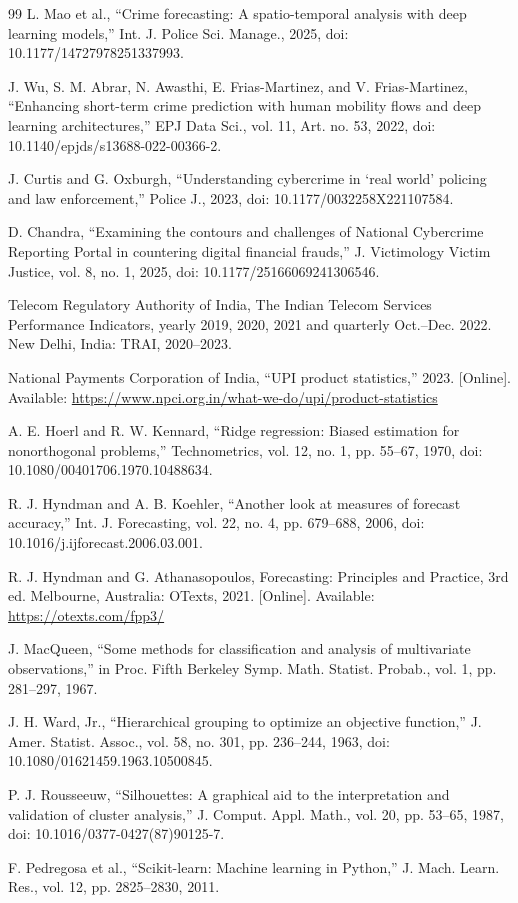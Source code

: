 \begin{thebibliography}{99}
 L. Mao et al., ``Crime forecasting: A spatio-temporal analysis with deep learning models,'' Int. J. Police Sci. Manage., 2025, doi: 10.1177/14727978251337993.

 J. Wu, S. M. Abrar, N. Awasthi, E. Frias-Martinez, and V. Frias-Martinez, ``Enhancing short-term crime prediction with human mobility flows and deep learning architectures,'' EPJ Data Sci., vol. 11, Art. no. 53, 2022, doi: 10.1140/epjds/s13688-022-00366-2.

 J. Curtis and G. Oxburgh, ``Understanding cybercrime in `real world' policing and law enforcement,'' Police J., 2023, doi: 10.1177/0032258X221107584.

 D. Chandra, ``Examining the contours and challenges of National Cybercrime Reporting Portal in countering digital financial frauds,'' J. Victimology Victim Justice, vol. 8, no. 1, 2025, doi: 10.1177/25166069241306546.

 Telecom Regulatory Authority of India, The Indian Telecom Services Performance Indicators, yearly 2019, 2020, 2021 and quarterly Oct.--Dec. 2022. New Delhi, India: TRAI, 2020--2023.

 National Payments Corporation of India, ``UPI product statistics,'' 2023. [Online]. Available: \url{https://www.npci.org.in/what-we-do/upi/product-statistics}

 A. E. Hoerl and R. W. Kennard, ``Ridge regression: Biased estimation for nonorthogonal problems,'' Technometrics, vol. 12, no. 1, pp. 55--67, 1970, doi: 10.1080/00401706.1970.10488634.

 R. J. Hyndman and A. B. Koehler, ``Another look at measures of forecast accuracy,'' Int. J. Forecasting, vol. 22, no. 4, pp. 679--688, 2006, doi: 10.1016/j.ijforecast.2006.03.001.

 R. J. Hyndman and G. Athanasopoulos, Forecasting: Principles and Practice, 3rd ed. Melbourne, Australia: OTexts, 2021. [Online]. Available: \url{https://otexts.com/fpp3/}

 J. MacQueen, ``Some methods for classification and analysis of multivariate observations,'' in Proc. Fifth Berkeley Symp. Math. Statist. Probab., vol. 1, pp. 281--297, 1967.

 J. H. Ward, Jr., ``Hierarchical grouping to optimize an objective function,'' J. Amer. Statist. Assoc., vol. 58, no. 301, pp. 236--244, 1963, doi: 10.1080/01621459.1963.10500845.

 P. J. Rousseeuw, ``Silhouettes: A graphical aid to the interpretation and validation of cluster analysis,'' J. Comput. Appl. Math., vol. 20, pp. 53--65, 1987, doi: 10.1016/0377-0427(87)90125-7.

 F. Pedregosa et al., ``Scikit-learn: Machine learning in Python,'' J. Mach. Learn. Res., vol. 12, pp. 2825--2830, 2011.
\end{thebibliography}
